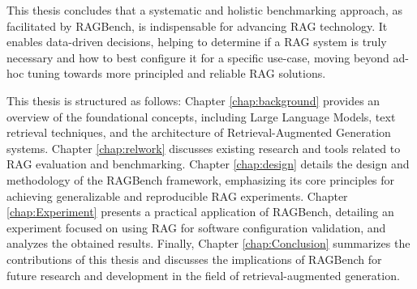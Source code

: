 This thesis concludes that a systematic and holistic benchmarking approach, as facilitated by RAGBench, is indispensable for advancing RAG technology. It enables data-driven decisions, helping to determine if a RAG system is truly necessary and how to best configure it for a specific use-case, moving beyond ad-hoc tuning towards more principled and reliable RAG solutions.

This thesis is structured as follows:
Chapter \ref{chap:background} provides an overview of the foundational concepts, including Large Language Models, text retrieval techniques, and the architecture of Retrieval-Augmented Generation systems.
Chapter \ref{chap:relwork} discusses existing research and tools related to RAG evaluation and benchmarking.
Chapter \ref{chap:design} details the design and methodology of the RAGBench framework, emphasizing its core principles for achieving generalizable and reproducible RAG experiments.
Chapter \ref{chap:Experiment} presents a practical application of RAGBench, detailing an experiment focused on using RAG for software configuration validation, and analyzes the obtained results.
Finally, Chapter \ref{chap:Conclusion} summarizes the contributions of this thesis and discusses the implications of RAGBench for future research and development in the field of retrieval-augmented generation.
